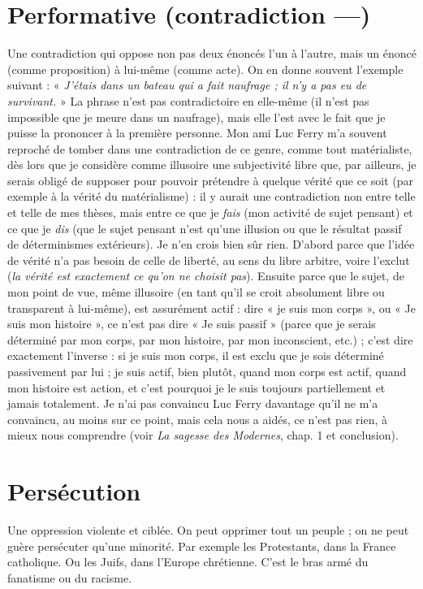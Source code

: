 \section{Performative (contradiction —)}
Une contradiction qui oppose
non pas deux énoncés l’un à
l’autre, mais un énoncé (comme proposition) à lui-même (comme acte). On en
donne souvent l'exemple suivant : « {\it J'étais dans un bateau qui a fait naufrage ;
il n'y a pas eu de survivant.} » La phrase n’est pas contradictoire en elle-même (il
n’est pas impossible que je meure dans un naufrage), mais elle l’est avec le fait
que je puisse la prononcer à la première personne. Mon ami Luc Ferry m’a souvent
reproché de tomber dans une contradiction de ce genre, comme tout
matérialiste, dès lors que je considère comme illusoire une subjectivité libre
que, par ailleurs, je serais obligé de supposer pour pouvoir prétendre à quelque
vérité que ce soit (par exemple à la vérité du matérialisme) : il y aurait une
contradiction non entre telle et telle de mes thèses, mais entre ce que je {\it fais}
(mon activité de sujet pensant) et ce que je {\it dis} (que le sujet pensant n’est
qu'une illusion ou que le résultat passif de déterminismes extérieurs). Je n’en
crois bien sûr rien. D'abord parce que l’idée de vérité n’a pas besoin de celle de
liberté, au sens du libre arbitre, voire l’exclut ({\it la vérité est exactement ce qu'on
ne choisit pas}). Ensuite parce que le sujet, de mon point de vue, même illusoire
(en tant qu’il se croit absolument libre ou transparent à lui-même), est assurément
actif : dire « je suis mon corps », ou « Je suis mon histoire », ce n’est pas
dire « Je suis passif » (parce que je serais déterminé par mon corps, par mon histoire,
par mon inconscient, etc.) ; c’est dire exactement l’inverse : si je suis mon
corps, il est exclu que je sois déterminé passivement par lui ; je suis actif, bien
plutôt, quand mon corps est actif, quand mon histoire est action, et c’est pourquoi
je le suis toujours partiellement et jamais totalement. Je n’ai pas convaincu
Luc Ferry davantage qu’il ne m’a convaincu, au moins sur ce point, mais cela
nous a aidés, ce n’est pas rien, à mieux nous comprendre (voir {\it La sagesse des
Modernes}, chap. 1 et conclusion).

\section{Persécution}
Une oppression violente et ciblée. On peut opprimer tout
un peuple ; on ne peut guère persécuter qu’une minorité.
Par exemple les Protestants, dans la France catholique. Ou les Juifs, dans
l’Europe chrétienne. C’est le bras armé du fanatisme ou du racisme.

